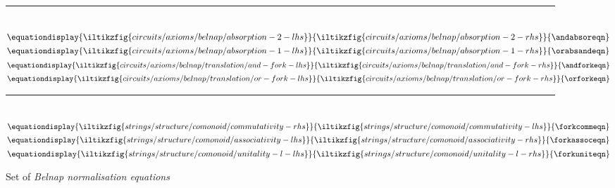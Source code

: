 \documentclass[10pt]{article}
\begin{document}
\begin{figure}[p]
{    }{
    }{\oranddisteqn}\)
    \\[0.25em]
    \rule{\textwidth}{0.1mm}
    \\[0.5em]
    \(\equationdisplay{
        \iltikzfig{circuits/axioms/belnap/absorption-2-lhs}
    }{
        \iltikzfig{circuits/axioms/belnap/absorption-2-rhs}
    }{\andabsoreqn}\)
    \quad
    \(\equationdisplay{
        \iltikzfig{circuits/axioms/belnap/absorption-1-lhs}
    }{
        \iltikzfig{circuits/axioms/belnap/absorption-1-rhs}
    }{\orabsandeqn}\)
    \quad
    \(\equationdisplay{
        \iltikzfig{circuits/axioms/belnap/translation/and-fork-lhs}
    }{
        \iltikzfig{circuits/axioms/belnap/translation/and-fork-rhs}
    }{\andforkeqn}\)
    \quad
    \(\equationdisplay{
        \iltikzfig{circuits/axioms/belnap/translation/or-fork-lhs}
    }{
        \iltikzfig{circuits/axioms/belnap/translation/or-fork-rhs}
    }{\orforkeqn}\)
    \\[0.25em]
    \rule{\textwidth}{0.1mm}
    \\[0.5em]
    \(\equationdisplay{
        \iltikzfig{strings/structure/comonoid/commutativity-rhs}
    }{
        \iltikzfig{strings/structure/comonoid/commutativity-lhs}
    }{\forkcommeqn}\)
    \quad
    \(\equationdisplay{
        \iltikzfig{strings/structure/comonoid/associativity-lhs}
    }{
        \iltikzfig{strings/structure/comonoid/associativity-rhs}
    }{\forkassoceqn}\)
    \quad
    \(\equationdisplay{
        \iltikzfig{strings/structure/comonoid/unitality-l-lhs}
    }{
        \iltikzfig{strings/structure/comonoid/unitality-l-rhs}
    }{\forkuniteqn}\)
    \caption{
        Set of \emph{Belnap normalisation equations}
    }
    \label{fig:normal-form-equations}
\end{figure}
\end{document}
